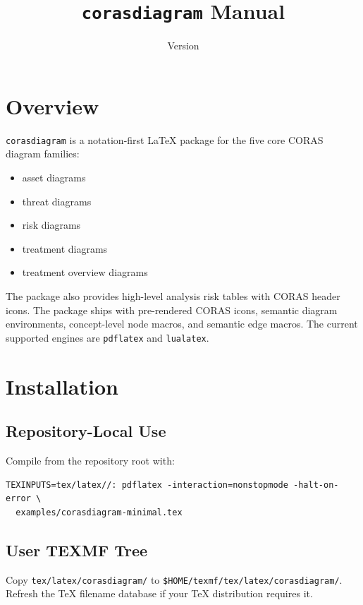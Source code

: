 \documentclass[a4paper]{article}
\title{\texttt{corasdiagram} Manual}
\date{Version \corasdiagramversion}
\begin{document}
\maketitle
\tableofcontents

\section{Overview}

\texttt{corasdiagram} is a notation-first LaTeX package for the five core CORAS
diagram families:

\begin{itemize}
  \item asset diagrams
  \item threat diagrams
  \item risk diagrams
  \item treatment diagrams
  \item treatment overview diagrams
\end{itemize}

The package also provides high-level analysis risk tables with CORAS header
icons. The package ships with pre-rendered CORAS icons, semantic diagram
environments, concept-level node macros, and semantic edge macros. The current
supported engines are \texttt{pdflatex} and \texttt{lualatex}.

\section{Installation}

\subsection{Repository-Local Use}

Compile from the repository root with:

\begin{verbatim}
TEXINPUTS=tex/latex//: pdflatex -interaction=nonstopmode -halt-on-error \
  examples/corasdiagram-minimal.tex
\end{verbatim}

\subsection{User TEXMF Tree}

Copy \texttt{tex/latex/corasdiagram/} to
\texttt{\$HOME/texmf/tex/latex/corasdiagram/}. Refresh the TeX filename
database if your TeX distribution requires it.
\end{document}
